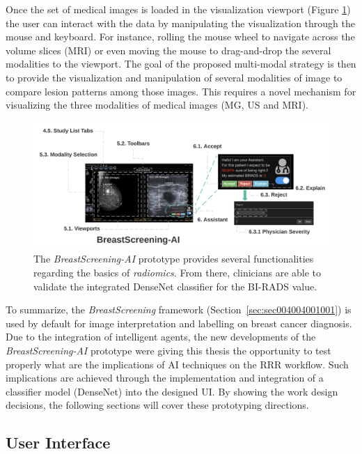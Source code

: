 Once the set of medical images is loaded in the visualization viewport (Figure \ref{fig:fig031}) the user can interact with the data by manipulating the visualization through the mouse and keyboard.
For instance, rolling the mouse wheel to navigate across the volume slices (\ac{MRI}) or even moving the mouse to drag-and-drop the several modalities to the viewport.
The goal of the proposed multi-modal strategy is then to provide the visualization and manipulation of several modalities of image to compare lesion patterns among those images.
This requires a novel mechanism for visualizing the three modalities of medical images (\ac{MG}, \ac{US} and \ac{MRI}).

\begin{figure}[ht]
\centering
\includegraphics[width=\textwidth]{images/fig031}
\caption{The {\it BreastScreening-AI} prototype provides several functionalities regarding the basics of {\it radiomics}. From there, clinicians are able to validate the integrated DenseNet classifier for the BI-RADS value.}
\label{fig:fig031}
\end{figure}

To summarize, the {\it BreastScreening} framework (Section~\ref{sec:sec004004001001}) is used by default for image interpretation and labelling on breast cancer diagnosis.
Due to the integration of intelligent agents, the new developments of the {\it BreastScreening-AI} prototype were giving this thesis the opportunity to test properly what are the implications of \ac{AI} techniques on the \ac{RRR} workflow.
Such implications are achieved through the implementation and integration of a classifier model (DenseNet) into the designed \ac{UI}.
By showing the work design decisions, the following sections will cover these prototyping directions.

\subsection{User Interface}
\label{sec:sec005004002}

